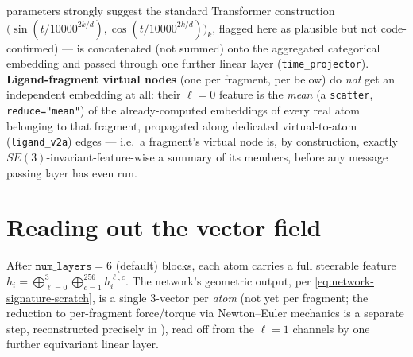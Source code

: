 \documentclass[11pt,a4paper]{report}
\theoremstyle{definition}
\theoremstyle{remark}
\newcommand{\pyfunc}[1]{\texttt{#1}}
\begin{document}
\begin{codebox}
parameters strongly suggest the standard Transformer construction
$\bigl(\sin(t/10000^{2k/d}),\cos(t/10000^{2k/d})\bigr)_{k}$, flagged here as
plausible but not code-confirmed) --- is concatenated (not summed) onto the
aggregated categorical embedding and passed through one further linear
layer (\pyfunc{time\_projector}). \textbf{Ligand-fragment virtual nodes}
(one per fragment, per  below) do
\emph{not} get an independent embedding at all: their $\ell=0$ feature is
the \emph{mean} (a \texttt{scatter}, \texttt{reduce="mean"}) of the
already-computed embeddings of every real atom belonging to that fragment,
propagated along dedicated virtual-to-atom (\texttt{ligand\_v2a}) edges ---
i.e.\ a fragment's virtual node is, by construction, exactly
$SE(3)$-invariant-feature-wise a summary of its members, before any message
passing layer has even run.
\end{codebox}

\section{Reading out the vector field}
\label{sec:equiformer-readout}

After $\texttt{num\_layers}=6$ (default) blocks, each atom carries a full
steerable feature $h_i=\bigoplus_{\ell=0}^3\bigoplus_{c=1}^{256}h_i^{\ell,c}$.
The network's geometric output, per
\eqref{eq:network-signature-scratch}, is a single $3$-vector per
\emph{atom} (not yet per fragment; the reduction to per-fragment
force/torque via Newton--Euler mechanics is a separate step, reconstructed
precisely in ), read off from the $\ell=1$ channels by
one further equivariant linear layer.
\end{document}
